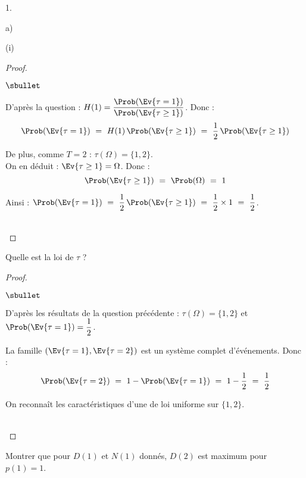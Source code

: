 \documentclass[11pt]{article}%
\begin{document}
\begin{noliste}{1.}
\begin{noliste}{a)}
\begin{nonoliste}{(i)}
      \begin{proof}~
        \begin{noliste}{$\sbullet$}
	  \item D'après la question  : $H(1) = 
	  \dfrac{\Prob(\Ev{\tau =1})}{\Prob(\Ev{\tau \geq 1})}$. Donc :
	  \[
	    \Prob(\Ev{\tau =1}) \ = \ H(1) \, \Prob(\Ev{\tau \geq 1})
	    \ = \ \dfrac{1}{2} \, \Prob(\Ev{\tau \geq 1})
	  \]
	  
	  \item De plus, comme $T=2$ : $\tau (\Omega) = \{1,2\}$.\\
	  On en déduit : $\Ev{\tau \geq 1} = \Omega$. Donc :
	  \[
	    \Prob(\Ev{\tau \geq 1}) \ = \ \Prob(\Omega) \ = \ 1
	  \]
	  
	  \item Ainsi : $\Prob(\Ev{\tau =1}) \ = \ \dfrac{1}{2} \,
	  \Prob(\Ev{\tau \geq 1}) \ = \  \dfrac{1}{2} \times 1 \ = \
	  \dfrac{1}{2}$.
        \end{noliste}
        ~\\[-1cm]
      \end{proof}
      
      
      \newpage

      
      \item Quelle est la loi de $\tau$ ?
      
      \begin{proof}~
        \begin{noliste}{$\sbullet$}
	  \item D'après les résultats de la question précédente : 
	  $\tau(\Omega) = \{1,2\}$ et $\Prob(\Ev{\tau=1}) = 
	  \dfrac{1}{2}$.
	  
	  \item La famille $(\Ev{\tau=1}, \Ev{\tau=2})$ est un 
	  système complet d'événements. Donc :
	  \[
	    \Prob(\Ev{\tau=2}) \ = \ 1-\Prob(\Ev{\tau =1}) \ = \ 1-
	    \dfrac{1}{2} \ = \ \dfrac{1}{2}
	  \]
	  
	  \item On reconnaît les caractéristiques d'une \var de loi 
	  uniforme sur $\{1,2\}$.
        \end{noliste}
        ~\\[-1.2cm]
      \end{proof}
    \end{nonoliste}
    
    \item Montrer que pour $D(1)$ et $N(1)$ donnés, $D(2)$ est maximum
    pour $p(1)=1$.
    

\end{noliste}
\end{noliste}
\end{document}
